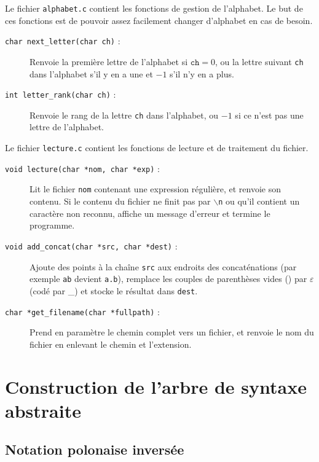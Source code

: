 \documentclass[12pt, a4paper]{article}
\begin{document}
Le fichier \texttt{alphabet.c} contient les fonctions de gestion de l'alphabet. Le but de ces fonctions est de pouvoir assez facilement changer d'alphabet en cas de besoin.
\begin{description}
\item[\texttt{char next\_letter(char ch)} :] Renvoie la première lettre de l'alphabet si $\texttt{ch} = 0$, ou la lettre suivant \texttt{ch} dans l'alphabet s'il y en a une et $-1$ s'il n'y en a plus.
\item[\texttt{int letter\_rank(char ch)} :] Renvoie le rang de la lettre \texttt{ch} dans l'alphabet, ou $-1$ si ce n'est pas une lettre de l'alphabet.
\end{description}

Le fichier \texttt{lecture.c} contient les fonctions de lecture et de traitement du fichier.
\begin{description}
\item[\texttt{void lecture(char *nom, char *exp)} :] Lit le fichier \texttt{nom} contenant une expression régulière, et renvoie son contenu. Si le contenu du fichier ne finit pas par \texttt{$\backslash$n} ou qu'il contient un caractère non reconnu, affiche un message d'erreur et termine le programme.
\item[\texttt{void add\_concat(char *src, char *dest)} :] Ajoute des points à la chaîne \texttt{src} aux endroits des concaténations (par exemple \texttt{ab} devient \texttt{a.b}), remplace les couples de parenthèses vides () par $\varepsilon$ (codé par \_) et stocke le résultat dans \texttt{dest}.
\item[\texttt{char *get\_filename(char *fullpath)} :] Prend en paramètre le chemin complet vers un fichier, et renvoie le nom du fichier en enlevant le chemin et l'extension.
\end{description}

\section{Construction de l'arbre de syntaxe abstraite}

\subsection{Notation polonaise inversée}
\end{document}
